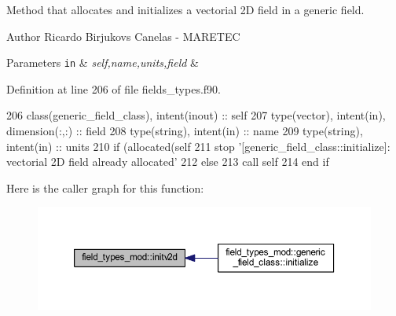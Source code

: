 Method that allocates and initializes a vectorial 2D field in a generic field. 

\begin{DoxyAuthor}{Author}
Ricardo Birjukovs Canelas -\/ M\+A\+R\+E\+T\+EC 
\end{DoxyAuthor}

\begin{DoxyParams}[1]{Parameters}
\mbox{\tt in}  & {\em self,name,units,field} & \\
\hline
\end{DoxyParams}


Definition at line 206 of file fields\+\_\+types.\+f90.


\begin{DoxyCode}
206     \textcolor{keywordtype}{class}(generic\_field\_class), \textcolor{keywordtype}{intent(inout)} :: self
207     \textcolor{keywordtype}{type}(vector), \textcolor{keywordtype}{intent(in)}, \textcolor{keywordtype}{dimension(:,:)} :: field
208     \textcolor{keywordtype}{type}(string), \textcolor{keywordtype}{intent(in)} :: name
209     \textcolor{keywordtype}{type}(string), \textcolor{keywordtype}{intent(in)} :: units
210     \textcolor{keywordflow}{if} (\textcolor{keyword}{allocated}(self%
211         stop \textcolor{stringliteral}{'[generic\_field\_class::initialize]: vectorial 2D field already allocated'}
212     \textcolor{keywordflow}{else}
213         \textcolor{keyword}{call }self%
214 \textcolor{keywordflow}{    end if}
\end{DoxyCode}
Here is the caller graph for this function\+:
\nopagebreak
\begin{figure}[H]
\begin{center}
\leavevmode
\includegraphics[width=350pt]{namespacefield__types__mod_a26cb1df2a85bf21d45693942957c9dae_icgraph}
\end{center}
\end{figure}
\mbox{\label{namespacefield__types__mod_ae163912444021fda00f4d821d4c85721}} 
